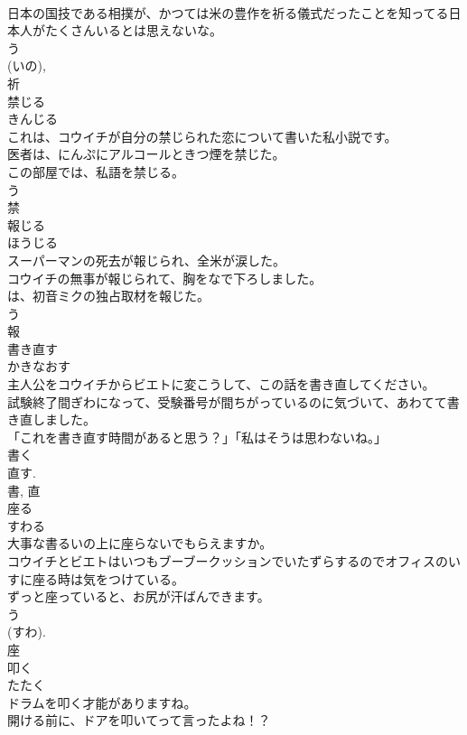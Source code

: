 \documentclass[8pt]{extreport}
\begin{document}
\begin{CJK}{UTF8}{min}
\\	日本の国技である相撲が、かつては米の豊作を祈る儀式だったことを知ってる日本人がたくさんいるとは思えないな。	
\\	う 
\\	(いの), 
\\	祈	
\\	禁じる	
\\	きんじる	
\\	これは、コウイチが自分の禁じられた恋について書いた私小説です。	
\\	医者は、にんぷにアルコールときつ煙を禁じた。	
\\	この部屋では、私語を禁じる。	
\\	う 
\\	禁	
\\	報じる	
\\	ほうじる	
\\	スーパーマンの死去が報じられ、全米が涙した。	
\\	コウイチの無事が報じられて、胸をなで下ろしました。	
\\	は、初音ミクの独占取材を報じた。	
\\	う 
\\	報	
\\	書き直す	
\\	かきなおす	
\\	主人公をコウイチからビエトに変こうして、この話を書き直してください。	
\\	試験終了間ぎわになって、受験番号が間ちがっているのに気づいて、あわてて書き直しました。	
\\	「これを書き直す時間があると思う？」「私はそうは思わないね。」	
\\	書く 
\\	直す. 
\\	書, 直	
\\	座る	
\\	すわる	
\\	大事な書るいの上に座らないでもらえますか。	
\\	コウイチとビエトはいつもブーブークッションでいたずらするのでオフィスのいすに座る時は気をつけている。	
\\	ずっと座っていると、お尻が汗ばんできます。	
\\	う 
\\	(すわ). 
\\	座	
\\	叩く	
\\	たたく	
\\	ドラムを叩く才能がありますね。	
\\	開ける前に、ドアを叩いてって言ったよね！？	

\end{CJK}
\end{document}
